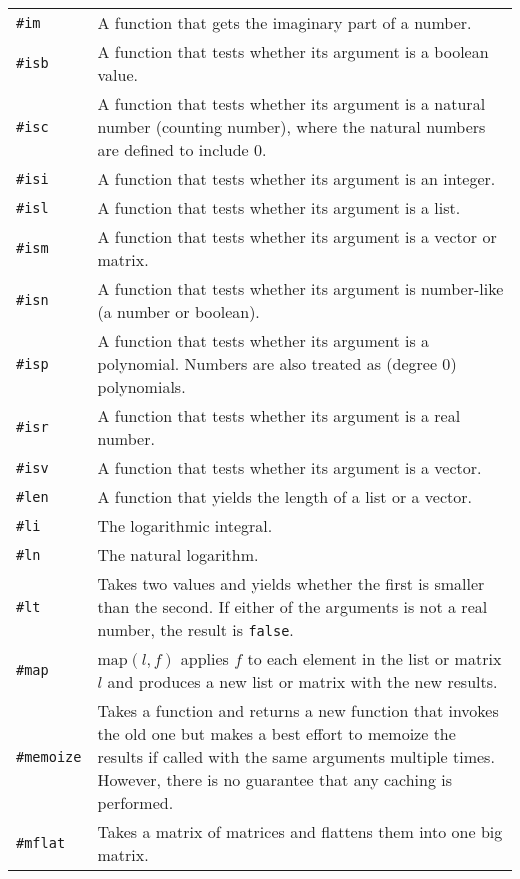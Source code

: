 \documentclass[10pt]{article}
\begin{document}
\begin{longtable}{p{}p{}}
        \verb|#im|        & A function that gets the imaginary part of a number. \\
        \verb|#isb|       & A function that tests whether its argument is a boolean value. \\
        \verb|#isc|       & A function that tests whether its argument is a natural number (counting number), where the natural numbers are defined to include $ 0 $. \\
        \verb|#isi|       & A function that tests whether its argument is an integer. \\
        \verb|#isl|       & A function that tests whether its argument is a list. \\
        \verb|#ism|       & A function that tests whether its argument is a vector or matrix. \\
        \verb|#isn|       & A function that tests whether its argument is number-like (a number or boolean). \\
        \verb|#isp|       & A function that tests whether its argument is a polynomial. Numbers are also treated as (degree $ 0 $) polynomials. \\
        \verb|#isr|       & A function that tests whether its argument is a real number. \\
        \verb|#isv|       & A function that tests whether its argument is a vector. \\
        \verb|#len|       & A function that yields the length of a list or a vector. \\
        \verb|#li|        & The logarithmic integral. \\
        \verb|#ln|        & The natural logarithm. \\
        \verb|#lt|        & Takes two values and yields whether the first is smaller than the second.
                            If either of the arguments is not a real number, the result is \verb|false|. \\
        \verb|#map|       & $ \mathrm{map}(l,f) $ applies $ f $ to each element in the list or matrix  $ l $ and produces a new list or matrix with the new results. \\
        \verb|#memoize|   & Takes a function and returns a new function that invokes the old one but makes a best effort to memoize the results if called with the same arguments multiple times.
                            However, there is no guarantee that any caching is performed. \\
        \verb|#mflat|     & Takes a matrix of matrices and flattens them into one big matrix.

\end{longtable}
\end{document}
